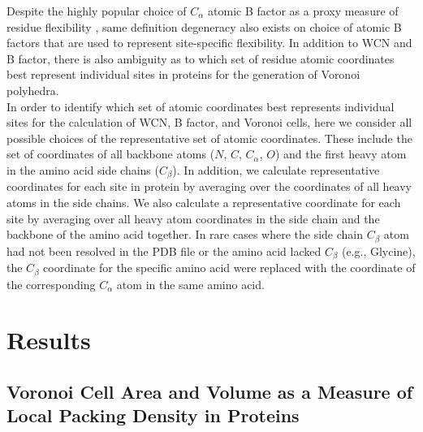 \documentclass[11pt]{article}
\begin{document}
        Despite the highly popular choice of $C_\alpha$ atomic B factor as a proxy measure of residue flexibility \citep[e.g.,][]{halle_flexibility_2002}, same definition degeneracy also exists on choice of atomic B factors that are used to represent site-specific flexibility. In addition to WCN and B factor, there is also ambiguity as to which set of residue atomic coordinates best represent individual sites in proteins for the generation of Voronoi polyhedra. \\

        In order to identify which set of atomic coordinates best represents individual sites for the calculation of WCN, B factor, and Voronoi cells, here we consider all possible choices of the representative set of atomic coordinates. These include the set of coordinates of all backbone atoms ($N$, $C$, $C_\alpha$, $O$) and the first heavy atom in the amino acid side chains ($C_\beta$). In addition, we calculate representative coordinates for each site in protein by averaging over the coordinates of all heavy atoms in the side chains. We also calculate a representative coordinate for each site by averaging over all heavy atom coordinates in the side chain and the backbone of the amino acid together. In rare cases where the side chain $C_\beta$ atom had not been resolved in the PDB file or the amino acid lacked $C_\beta$ (e.g., Glycine), the $C_\beta$ coordinate for the specific amino acid were replaced with the coordinate of the corresponding $C_\alpha$ atom in the same amino acid. \\


\section{Results}
\label{sec:results}

    \subsection*{Voronoi Cell Area and Volume as a Measure of Local Packing Density in Proteins}
\end{document}
